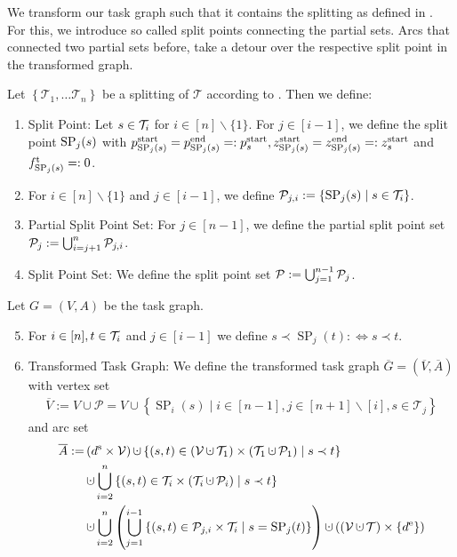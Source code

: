 We transform our task graph such that it contains the splitting as defined in . For this, we introduce so called split points connecting the partial sets. Arcs that connected two partial sets before, take a detour over the respective split point in the transformed graph.

\begin{definition}

Let $\left\{\mathcal{T}_1,\dots\mathcal{T}_n\right\}$ be a splitting of $\mathcal{T}$ according to . Then we define:
\begin{enumerate}
	\item{Split Point: Let $s\in\mathcal{T}_i$ for $i\in[n]\backslash\{1\}$. For $j\in[i-1]$, we define the split point $\operatorname{SP}_j(s)$ with $p^{\operatorname{start}}_{\operatorname{SP}_j(s)}=p^{\operatorname{end}}_{\operatorname{SP}_j(s)}=:p^{\operatorname{start}}_s, z^{\operatorname{start}}_{\operatorname{SP}_j(s)}=z^{\operatorname{end}}_{\operatorname{SP}_j(s)}=:z^{\operatorname{start}}_s$ and $f^{\operatorname{t}}_{\operatorname{SP}_j(s)}=:0$.}
	\item{For $i\in[n]\backslash\{1\}$ and $j\in[i-1]$, we define $\mathcal{P}_{j,i}:=\left\{\operatorname{SP}_j(s)\mid s\in\mathcal{T}_i\right\}$.}
	\item{Partial Split Point Set: For $j\in[n-1]$, we define the partial split point set $\mathcal{P}_j:=\bigcup_{i=j+1}^n \mathcal{P}_{j,i}$.}
	\item{Split Point Set: We define the split point set $\mathcal{P}:=\bigcup_{j=1}^{n-1}\mathcal{P}_j$.}
\end{enumerate}

Let $G=(V,A)$ be the task graph.
\begin{enumerate}
	\setcounter{enumi}{4}
	\item{For $i\in[n], t\in\mathcal{T}_i$ and $j\in[i-1]$ we define ${s\prec\operatorname{SP}_j(t):\Leftrightarrow s\prec t}$.}
	\item{Transformed Task Graph: We define the transformed task graph $\overline{G}=\left(\overline{V},\overline{A}\right)$ with vertex set
		\begin{align*}
			\overline{V} := V\cup \mathcal{P} = V\cup\left\{\operatorname{SP}_i(s)\mid i\in[n-1],j\in[n+1]\backslash[i],s\in\mathcal{T}_j\right\}
		\end{align*}
		and arc set
		\begin{align*}
			\overline{A} := & \left(\ds\times\mathcal{V}\right)\cupdot\left\{(s,t)\in\left(\mathcal{V}\cupdot\mathcal{T}_1\right)\times\left( \mathcal{T}_1\cupdot\mathcal{P}_1\right)\mid s\prec t\right\} \\
			& \cupdot\bigcup_{i=2}^n\left\{(s,t)\in\Ti\times\left(\Ti\cupdot \mathcal{P}_i\right)\mid s\prec t\right\} \\
			& \cupdot\bigcup_{i=2}^n\left(\bigcup_{j=1}^{i-1}\left\{(s,t)\in\mathcal{P}_{j,i}\times\Ti\mid s=\operatorname{SP}_j(t)\right\}\right)\cupdot \left(\left(\mathcal{V}\cupdot\mathcal{T}\right)\times\left\{\de\right\}\right)
		\end{align*}}
\end{enumerate}

\end{definition}

